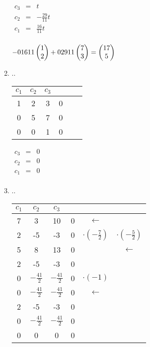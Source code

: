 \begin{enumerate}
						
						
							$\begin{array} {ccc}
								c_3 & = & t\\
								c_2 & = & -\frac{29}{11}t\\
								c_1 & = & \frac{16}{11}t\\
							\end{array}$
						
						
						
							$-\frac{16}{11} \mvect{1\\2} + \frac{29}{11} \mvect{7\\3} = \mvect{17\\5}$
						
						
				    \item ..
				    	
							\begin{tabular} {ccc|ccc}
								$c_1$ & $c_2$ & $c_3$ & & &\\
								\hline
								1 & 2 & 3 & 0 & & \\
								0 & 5 & 7 & 0 & & \\
								0 & 0 & 1 & 0 & & \\
							\end{tabular}
						
						
						
							$\begin{array} {ccc}
								c_3 & = & 0\\
								c_2 & = & 0\\
								c_1 & = & 0\\
							\end{array}$
						
						
				    \item ..
						
							\begin{tabular} {ccc|ccc}
								$c_1$ & $c_2$ & $c_3$ & & &\\
								\hline
								7 & 3 & 10 & 0 & $\leftarrow$ & \\
								2 & -5 & -3 & 0 & $\cdot(-\frac{7}{2})$ & $\cdot(-\frac{5}{2})$ \\
								5 & 8 & 13 & 0 & & $\leftarrow$ \\
								\hline
								2 & -5 & -3 & 0 & & \\
								0 & $-\frac{41}{2}$ & $-\frac{41}{2}$ & 0 & $\cdot(-1)$ & \\
								0 & $-\frac{41}{2}$ & $-\frac{41}{2}$ & 0 & $\leftarrow$ & \\
								\hline
								2 & -5 & -3 & 0 & & \\
								0 & $-\frac{41}{2}$ & $-\frac{41}{2}$ & 0 & & \\
								0 & 0 & 0 & 0 & & \\
							\end{tabular}
						

\end{enumerate}
